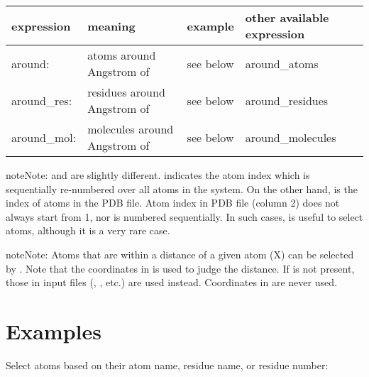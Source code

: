 \documentclass[a4paper,11pt,oneside,english]{sphinxmanual}
\begin{document}
\begin{savenotes}\sphinxattablestart
\centering
\begin{tabulary}{\linewidth}[t]{|T|T|T|T|}
\hline
\sphinxstyletheadfamily 
expression
&\sphinxstyletheadfamily 
meaning
&\sphinxstyletheadfamily 
example
&\sphinxstyletheadfamily 
other available expression
\\
\hline
{} around: 
&
atoms around  Angstrom of 
&
see below
&
around\_atoms
\\
\hline
{} around\_res: 
&
residues around  Angstrom of 
&
see below
&
around\_residues
\\
\hline
{} around\_mol: 
&
molecules around  Angstrom of 
&
see below
&
around\_molecules
\\
\hline
\end{tabulary}
\par
\sphinxattableend\end{savenotes}

\begin{sphinxadmonition}{note}{Note:}
 and  are slightly different.  indicates the atom index
which is sequentially re-numbered over all atoms in the system.
On the other hand,  is the index of atoms in the PDB file.
Atom index in PDB file (column 2) does not always start from 1, nor is numbered sequentially.
In such cases,  is useful to select atoms, although it is a very rare case.
\end{sphinxadmonition}

\begin{sphinxadmonition}{note}{Note:}
Atoms that are within a distance of a given atom (X) can be selected by .
Note that the coordinates in  is used to judge the distance. If 
is not present, those in input files (, , etc.) are used instead.
Coordinates in  are never used.
\end{sphinxadmonition}


\section{Examples}
\label{\detokenize{11_Selection:examples}}
Select atoms based on their atom name, residue name, or residue number:
\end{document}
